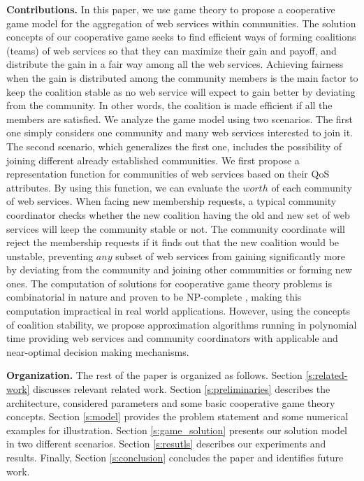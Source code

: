 \documentclass[10pt,journal,cspaper,compsoc]{IEEEtran}
\begin{document}
\textbf{Contributions.} In this paper, we use game theory to
propose a cooperative game model for the aggregation of web
services within communities. The solution concepts of our
cooperative game seeks to find efficient ways of forming
coalitions (teams) of web services so that they can maximize their
gain and payoff, and distribute the gain in a fair way among all
the web services. Achieving fairness when the gain is distributed
among the community members is the main factor to keep the
coalition stable as no web service will expect to gain better by
deviating from the community. In other words, the coalition is
made efficient if all the members are satisfied. We analyze the
game model using two scenarios. The first one simply considers one
community and many web services interested to join it. The second
scenario, which generalizes the first one, includes the
possibility of joining different already established communities.
We first propose a representation function for communities of web
services based on their QoS attributes. By using this function, we
can evaluate the $worth$ of each community of web services. When
facing new membership requests, a typical community coordinator
checks whether the new coalition having the old and new set of web
services will keep the community stable or not. The community
coordinate will reject the membership requests if it finds out
that the new coalition would be unstable, preventing $any$ subset
of web services from gaining significantly more by deviating from
the community and joining other communities or forming new ones.
The computation of solutions for cooperative game theory problems
is combinatorial in nature and proven to be NP-complete
\cite{Algorithmic}, making this computation impractical in real
world applications. However, using the concepts of coalition
stability, we propose approximation algorithms running in
polynomial time providing web services and community coordinators
with applicable and near-optimal decision making mechanisms.

\textbf{Organization.} The rest of the paper is organized as
follows. Section \ref{s:related-work} discusses relevant related
work. Section \ref{s:preliminaries} describes the architecture,
considered parameters and some basic cooperative game theory
concepts. Section \ref{s:model} provides the problem statement and
some numerical examples for illustration. Section
\ref{s:game_solution} presents our solution model in two different
scenarios. Section \ref{s:resutls} describes our experiments and
results. Finally, Section \ref{s:conclusion} concludes the paper
and identifies future work.
\end{document}
